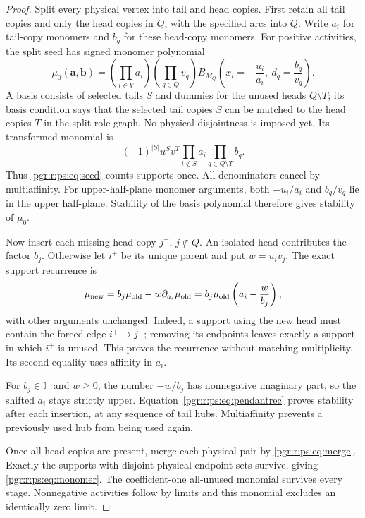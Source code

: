 \documentclass[11pt]{article}
\numberwithin{equation}{section}
\theoremstyle{definition}\newtheorem{definition}[theorem]{Definition}\newtheorem{remark}[theorem]{Remark}
\newcommand{\HH}{\mathbb H}                %
\begin{document}
\begin{proof}
Split every physical vertex into tail and head copies. First retain all tail copies and only the head copies in $Q$, with the specified arcs into $Q$. Write $a_i$ for tail-copy monomers and $b_q$ for these head-copy monomers. For positive activities, the split seed has signed monomer polynomial
\begin{equation}\label{pgr:r:ps:eq:seed}
 \mu_0(\mathbf a,\mathbf b)=
 \left(\prod_{i\in V}a_i\right)\left(\prod_{q\in Q}v_q\right)
 B_{M_Q}\left(x_i=-\frac{u_i}{a_i},\ d_q=\frac{b_q}{v_q}\right).
\end{equation}
A basis consists of selected tails $S$ and dummies for the unused heads $Q\setminus T$; its basis condition says that the selected tail copies $S$ can be matched to the head copies $T$ in the split role graph. No physical disjointness is imposed yet. Its transformed monomial is
\[
 (-1)^{|S|}u^Sv^T\prod_{i\notin S}a_i\prod_{q\in Q\setminus T}b_q.
\]
Thus \eqref{pgr:r:ps:eq:seed} counts supports once. All denominators cancel by multiaffinity. For upper-half-plane monomer arguments, both $-u_i/a_i$ and $b_q/v_q$ lie in the upper half-plane. Stability of the basis polynomial therefore gives stability of $\mu_0$.

Now insert each missing head copy $j^-$, $j\notin Q$. An isolated head contributes the factor $b_j$. Otherwise let $i^+$ be its unique parent and put $w=u_iv_j$. The exact support recurrence is
\begin{equation}\label{pgr:r:ps:eq:pendantrec}
 \mu_{\rm new}=b_j\mu_{\rm old}-w\partial_{a_i}\mu_{\rm old}
 =b_j\mu_{\rm old}\left(a_i-\frac{w}{b_j}\right),
\end{equation}
with other arguments unchanged. Indeed, a support using the new head must contain the forced edge $i^+\to j^-$; removing its endpoints leaves exactly a support in which $i^+$ is unused. This proves the recurrence without matching multiplicity. Its second equality uses affinity in $a_i$.

For $b_j\in\HH$ and $w\ge0$, the number $-w/b_j$ has nonnegative imaginary part, so the shifted $a_i$ stays strictly upper. Equation~\eqref{pgr:r:ps:eq:pendantrec} proves stability after each insertion, at any sequence of tail hubs. Multiaffinity prevents a previously used hub from being used again.

Once all head copies are present, merge each physical pair by \eqref{pgr:r:ps:eq:merge}. Exactly the supports with disjoint physical endpoint sets survive, giving \eqref{pgr:r:ps:eq:monomer}. The coefficient-one all-unused monomial survives every stage. Nonnegative activities follow by limits and this monomial excludes an identically zero limit.


\end{proof}
\end{document}

